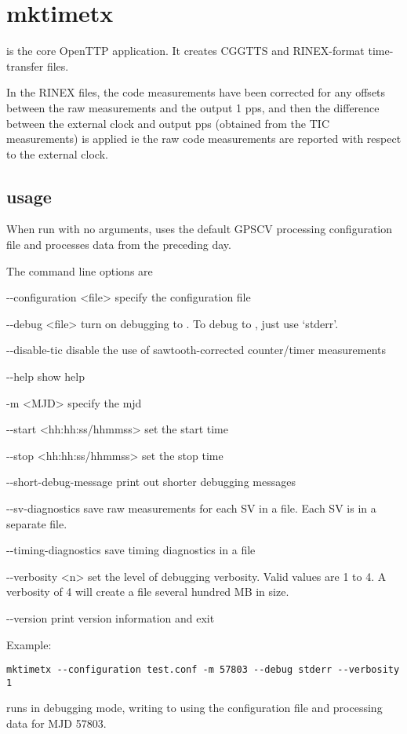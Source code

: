 
\section{mktimetx}

\hypertarget{h:mktimetx}{}

 is the core OpenTTP application.
It creates CGGTTS and RINEX-format time-transfer files.

In the RINEX files, the code measurements have been corrected for any offsets between the raw measurements
and the output 1 pps, and then the difference between the external clock and output pps (obtained from the TIC measurements)
is applied ie the raw code measurements are reported with respect to the external clock.

\subsection{usage}

When run with no arguments,  uses the default GPSCV processing configuration file 
 and processes data from the preceding day.

The command line options are
\begin{description*}
	\item[-{}-configuration \textless{file}\textgreater] specify the configuration file
	\item[-{}-debug \textless{file}\textgreater]	turn on debugging to . To debug to , just use `stderr'.
	\item[-{}-disable-tic] disable the use of sawtooth-corrected counter/timer measurements 
	\item[-{}-help] show help
	\item[-m \textless{MJD}\textgreater] specify the mjd
	\item[-{}-start \textless{hh:hh:ss/hhmmss}\textgreater]  set the start time
	\item[-{}-stop  \textless{hh:hh:ss/hhmmss}\textgreater]  set the stop time
	\item[-{}-short-debug-message] print out shorter debugging messages
	\item[-{}-sv-diagnostics] save raw measurements for each SV in a file. Each SV is in a separate file.
	\item[-{}-timing-diagnostics] save timing diagnostics in a file
	\item[-{}-verbosity \textless{n}\textgreater] set the level of debugging verbosity. 
		Valid values are 1 to 4. A verbosity of 4 will create a file several  hundred MB in size.
	\item[-{}-version] print version information	and exit
\end{description*}
Example:
\begin{lstlisting}
mktimetx --configuration test.conf -m 57803 --debug stderr --verbosity 1 
\end{lstlisting}
runs  in debugging mode, writing to  using the configuration file  and processing
data for MJD 57803.

